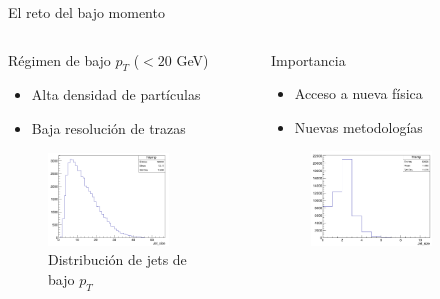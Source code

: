 \documentclass[aspectratio=169]{beamer}
\begin{document}
\begin{frame}{El reto del bajo momento}
  \begin{columns}
    \begin{column}{0.48\textwidth}
      \begin{block}{Régimen de bajo \texorpdfstring{$p_T$}{pT} ($<20$ GeV)}
        \begin{itemize}
          \item Alta densidad de partículas
          \item Baja resolución de trazas
        \end{itemize}
      \end{block}
      \vspace{-0.3em}
      \begin{figure}
        \includegraphics[width=0.75\textwidth]{njetl.png}
        \caption{\small Distribución de jets de bajo \texorpdfstring{$p_T$}{pT}}
      \end{figure}
    \end{column}
    \begin{column}{0.48\textwidth}
      \begin{block}{Importancia}
        \begin{itemize}
          \item Acceso a nueva física
          \item Nuevas metodologías
        \end{itemize}
      \end{block}
      \vspace{-0.3em}
      \begin{figure}
        \includegraphics[width=0.75\textwidth]{njeth.png}

\end{figure}
\end{column}
\end{columns}
\end{frame}
\end{document}
